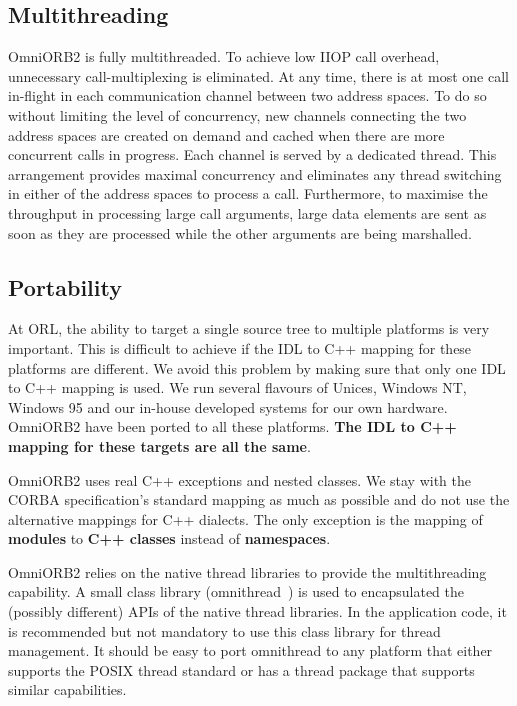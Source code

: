\documentclass[11pt,twoside,onecolumn]{book}
\begin{document}
\subsection{Multithreading}

OmniORB2 is fully multithreaded. To achieve low IIOP call overhead,
unnecessary call-multiplexing is eliminated. At any time, there is at most
one call in-flight in each communication channel between two address
spaces. To do so without limiting the level of concurrency, new channels
connecting the two address spaces are created on demand and cached when
there are more concurrent calls in progress. Each channel is served by a
dedicated thread. This arrangement provides maximal concurrency and
eliminates any thread switching in either of the address spaces to process
a call. Furthermore, to maximise the throughput in processing large call
arguments, large data elements are sent as soon as they are processed while
the other arguments are being marshalled.

\subsection{Portability}

At ORL, the ability to target a single source tree to multiple platforms is
very important. This is difficult to achieve if the IDL to C++ mapping for
these platforms are different. We avoid this problem by making sure that
only one IDL to C++ mapping is used. We run several flavours of Unices, Windows
NT, Windows 95 and our in-house developed systems for our own
hardware. OmniORB2 have been ported to all these platforms. {\bf The IDL to
C++ mapping for these targets are all the same}.

OmniORB2 uses real C++ exceptions and nested classes. We stay with the
CORBA specification's standard mapping as much as possible and do not use
the alternative mappings for C++ dialects. The only exception is the
mapping of {\bf modules} to {\bf C++ classes} instead of {\bf namespaces}.

OmniORB2 relies on the native thread libraries to provide the
multithreading capability. A small class library (omnithread~\cite{tjr96a})
is used to encapsulated the (possibly different) APIs of the native thread
libraries. In the application code, it is recommended but not mandatory to
use this class library for thread management. It should be easy to port
omnithread to any platform that either supports the POSIX thread standard
or has a thread package that supports similar capabilities.
\end{document}

